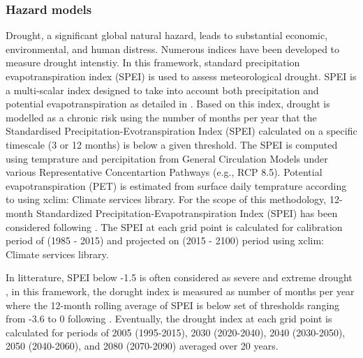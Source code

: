 \documentclass[a4paper,11pt]{extarticle} %
\theoremstyle{definition}
\begin{document}
\subsubsection{Hazard models}
Drought, a significant global natural hazard, leads to substantial economic, environmental, and human distress. Numerous indices have been developed to measure drought intenstiy. In this framework, standard precipitation evapotranspiration index (SPEI) is used to assess meteorological drought. SPEI is a multi-scalar index designed to take into account both precipitation and potential evapotranspiration as detailed in \cite{VicenteSerranoEtAl:2010,begueria2014standardized}. Based on this index, drought is modelled as a chronic risk using the number of months per year that the Standardised Precipitation-Evotranspiration Index (SPEI) calculated on a specific timescale (3 or 12 months) is below a given threshold.
The SPEI is computed using temprature and percipitation from General Circulation Models under various Representative Concentartion Pathways (e.g., RCP 8.5). Potential evapotranspiration (PET) is estimated from surface daily temprature according to \cite{tanguy2018historical} using xclim: Climate services library. For the scope of this methodology, 12-month Standardized Precipitation-Evapotranspiration Index (SPEI) has been considered following \cite{marzi2021assessing,arias2020impacts,inform2022climate}. The SPEI at each grid point is calculated for calibration period of (1985 - 2015) and projected on (2015 - 2100) period using xclim: Climate services library.

In litterature, SPEI below -1.5 is often considered as severe and extreme drought \cite{smirnov2016relative}, in this framework, the dorught index is measured as number of months per year where the 12-month rolling average of SPEI is below  set of thresholds ranging from -3.6 to 0 following \cite{LuoEtAl:2021} . Eventually, the drought index at each grid point is calculated for periods of 2005 (1995-2015), 2030 (2020-2040), 2040 (2030-2050), 2050 (2040-2060), and 2080 (2070-2090) averaged over 20 years.

\end{document}
